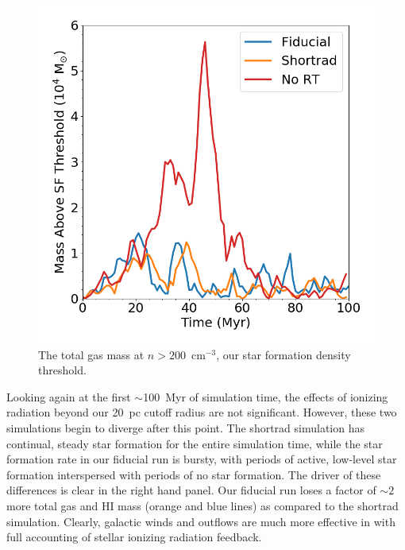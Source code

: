 \begin{figure}
\centering
\includegraphics[width=0.99\linewidth]{figures/ch2/mass_density_cut}
\caption{The total gas mass at $n > 200$~cm$^{-3}$, our star formation density threshold.}
\label{ch2:figsf gas}
\end{figure}

Looking again at the first $\sim$100~Myr of simulation time, the effects of ionizing radiation beyond our 20~pc cutoff radius are not significant. However, these two simulations begin to diverge after this point. The shortrad simulation has continual, steady star formation for the entire simulation time, while the star formation rate in our fiducial run is bursty, with periods of active, low-level star formation interspersed with periods of no star formation. The driver of these differences is clear in the right hand panel. Our fiducial run loses a factor of $\sim 2$ more total gas and HI mass (orange and blue lines) as compared to the shortrad simulation. Clearly, galactic winds and outflows are much more effective in with full accounting of stellar ionizing radiation feedback.

